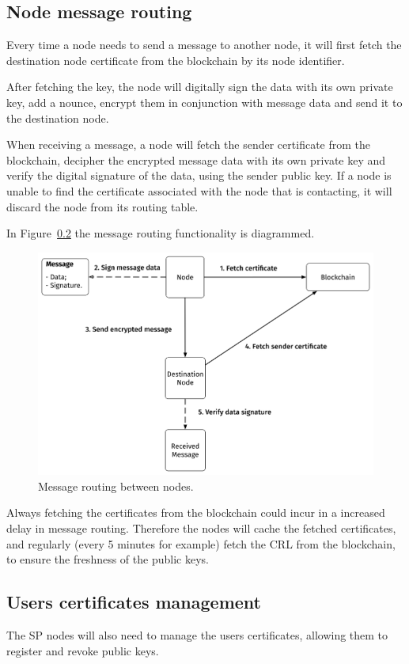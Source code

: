 \subsection{Node message routing}
Every time a node needs to send a message to another node, it will first fetch the destination node certificate from the blockchain by its node identifier.

After fetching the key, the node will digitally sign the data with its own private key, add a nounce, encrypt them in conjunction with message data and send it to the destination node.

When receiving a message, a node will fetch the sender certificate from the blockchain, decipher the encrypted message data with its own private key and verify the digital signature of the data, using the sender public key.
If a node is unable to find the certificate associated with the node that is contacting, it will discard the node from its routing table.

In Figure~\ref{} the message routing functionality is diagrammed.

\begin{figure}
    \includegraphics[width=\linewidth]{Figures/message-routing.png}
    \caption{Message routing between nodes.}
    \label{fig:message-routing}
\end{figure}

Always fetching the certificates from the blockchain could incur in a increased delay in message routing.
Therefore the nodes will cache the fetched certificates, and regularly (every 5 minutes for example) fetch the CRL from the blockchain, to ensure the freshness of the public keys.

\subsection{Users certificates management}
The SP nodes will also need to manage the users certificates, allowing them to register and revoke public keys.

